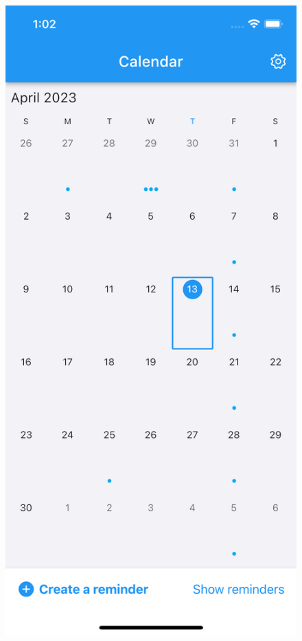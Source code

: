\begin{figure}
\centering
\begin{minipage}{.5\textwidth}
  \centering
  \includegraphics[width=0.8\linewidth]{res/calendar_view1.png}
  \label{fig:calendar_view1}
\end{minipage}%
\begin{minipage}{.5\textwidth}
  \centering

\end{minipage}
\end{figure}
